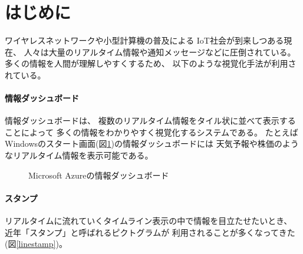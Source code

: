 \section{はじめに}


ワイヤレスネットワークや小型計算機の普及による
IoT社会が到来しつある現在、
人々は大量のリアルタイム情報や通知メッセージなどに圧倒されている。
%
多くの情報を人間が理解しやすくするため、
以下のような視覚化手法が利用されている。

\vspace{3mm}

\paragraph*{情報ダッシュボード}

情報ダッシュボード\cite{few}は、
複数のリアルタイム情報をタイル状に並べて表示することによって
多くの情報をわかりやすく視覚化するシステムである。
たとえばWindowsのスタート画面(図\ref{azure})の情報ダッシュボードには
天気予報や株価のようなリアルタイム情報を表示可能である。

\begin{figure}[h]
\centering{}
\caption{Microsoft Azureの情報ダッシュボード}
\label{azure}
\end{figure}

\vspace{2mm}
\paragraph*{スタンプ}

リアルタイムに流れていくタイムライン表示の中で情報を目立たせたいとき、
近年「スタンプ」と呼ばれるピクトグラムが
利用されることが多くなってきた(図\ref{linestamp})。

